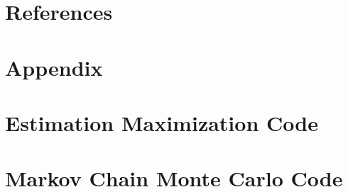 \documentclass{article}
\begin{document}
\section{References}
\printbibliography

\newpage
\section*{Appendix}
\appendix 
\section{Estimation Maximization Code}



\newpage
\section{Markov Chain Monte Carlo Code}


\end{document}
